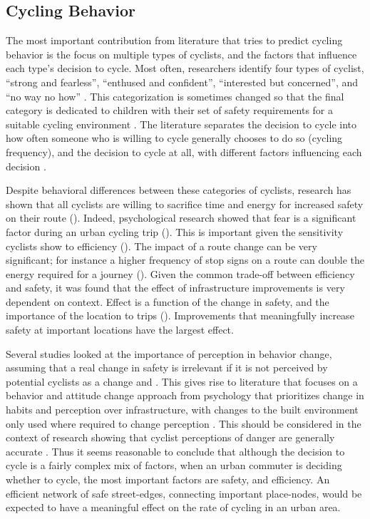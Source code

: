 
\subsection{Cycling Behavior}

The most important contribution from literature that tries to predict cycling behavior is the focus on multiple types of cyclists, and the factors that influence each type's decision to cycle. Most often, researchers identify four types of cyclist, ``strong and fearless'', ``enthused and confident'', ``interested but concerned'', and ``no way no how'' \parencite{dill2013four}. This categorization is sometimes changed so that the final category is dedicated to children with their set of safety requirements for a suitable cycling environment \parencite{mekuria2012low}. The literature separates the decision to cycle into how often someone who is willing to cycle generally chooses to do so (cycling frequency), and the decision to cycle at all, with different factors influencing each decision \parencite{stinson2005comparison}. 

Despite behavioral differences between these categories of cyclists, research has shown that all cyclists are willing to sacrifice time and energy for increased safety on their route (\cite{winters2011motivators}). Indeed, psychological research showed that fear is a significant factor during an urban cycling trip (\cite{ellett2018state}). This is important given the sensitivity cyclists show to efficiency (\cite{wuerzer2015cycling}). The impact of a route change can be very significant; for instance a higher frequency of stop signs on a route can double the energy required for a journey (\cite{fajans2001bicyclists}). Given the common trade-off between efficiency and safety, it was found that the effect of infrastructure improvements is very dependent on context. Effect is a function of the change in safety, and the importance of the location to trips (\cite{kondo2018bike}). Improvements that meaningfully increase safety at important locations have the largest effect. 

Several studies looked at the importance of perception in behavior change, assuming that a real change in safety is irrelevant if it is not perceived by potential cyclists as a change \parencite{li2012physical} and \parencite{parkin2007models}. This gives rise to literature that focuses on a behavior and attitude change approach from psychology that prioritizes change in habits and perception over infrastructure, with changes to the built environment only used where required to change perception \parencite{savan2017integrated}. This should be considered in the context of research showing that cyclist perceptions of danger are generally accurate \parencite{vandenbulcke2014predicting}. Thus it seems reasonable to conclude that although the decision to cycle is a fairly complex mix of factors, when an urban commuter is deciding whether to cycle, the most important factors are safety, and efficiency. An efficient network of safe street-edges, connecting important place-nodes, would be expected to have a meaningful effect on the rate of cycling in an urban area.  

